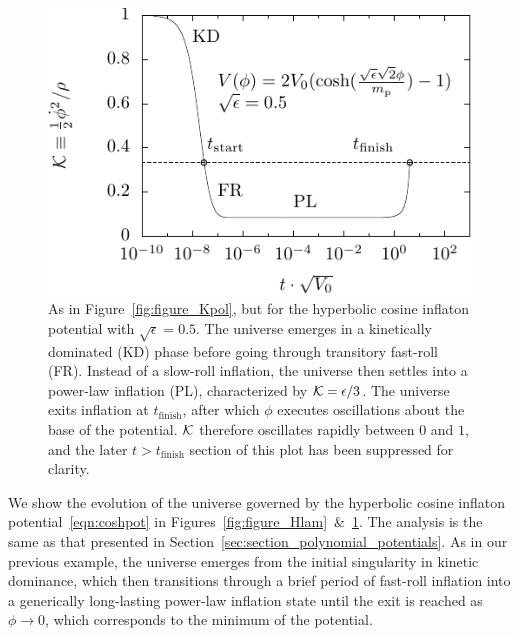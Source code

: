 %
\begin{figure}[tp]
  \includegraphics[width=\textwidth]{chapters/kinetic_dominance/figures/Klam}
  \caption{As in Figure~\protect\ref{fig:figure_Kpol}, but for the hyperbolic cosine inflaton potential with \(\sqrt{\epsilon}=0.5\). The universe emerges in a kinetically dominated (KD) phase before going through transitory fast-roll (FR). Instead of a slow-roll inflation, the universe then settles into a power-law inflation (PL), characterized by \(\mathcal{K}=\epsilon/3\). The universe exits inflation at \(t_\mathrm{finish}\), after which \(\phi\) executes oscillations about the base of the potential. \(\mathcal{K}\) therefore oscillates rapidly between \(0\) and \(1\), and the later \(t>t_\mathrm{finish}\) section of this plot has been suppressed for clarity.\label{fig:figure_Klam}}
\end{figure}
%

We show the evolution of the universe governed by the hyperbolic cosine inflaton potential~\eqref{eqn:coshpot} in Figures~\ref{fig:figure_Hlam}~\&~\ref{fig:figure_Klam}. The analysis is the same as that presented in Section~\ref{sec:section_polynomial_potentials}.  As in our previous example, the universe emerges from the initial singularity in kinetic dominance, which then transitions through a brief period of fast-roll inflation into a generically long-lasting power-law inflation state until the exit is reached as \(\phi\rightarrow0\), which corresponds to the minimum of the potential.  

